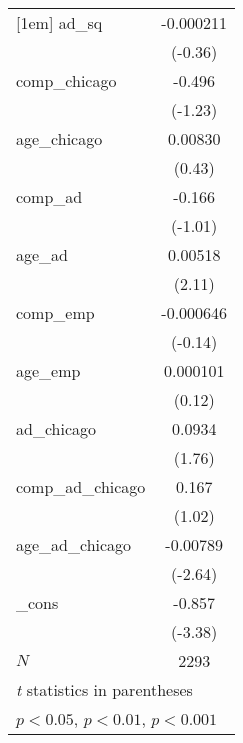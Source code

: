 {\begin{tabular}{l*{1}{c}}
[1em]
ad\_sq       &   -0.000211         \\
            &     (-0.36)         \\
[1em]
comp\_chicago&      -0.496         \\
            &     (-1.23)         \\
[1em]
age\_chicago &     0.00830         \\
            &      (0.43)         \\
[1em]
comp\_ad     &      -0.166         \\
            &     (-1.01)         \\
[1em]
age\_ad      &     0.00518\sym{*}  \\
            &      (2.11)         \\
[1em]
comp\_emp    &   -0.000646         \\
            &     (-0.14)         \\
[1em]
age\_emp     &    0.000101         \\
            &      (0.12)         \\
[1em]
ad\_chicago  &      0.0934         \\
            &      (1.76)         \\
[1em]
comp\_ad\_chicago&       0.167         \\
            &      (1.02)         \\
[1em]
age\_ad\_chicago&    -0.00789\sym{**} \\
            &     (-2.64)         \\
[1em]
\_cons      &      -0.857\sym{***}\\
            &     (-3.38)         \\
\hline
\(N\)       &        2293         \\
\hline\hline
\multicolumn{2}{l}{\footnotesize \textit{t} statistics in parentheses}\\
\multicolumn{2}{l}{\footnotesize \sym{*} \(p<0.05\), \sym{**} \(p<0.01\), \sym{***} \(p<0.001\)}\\
\end{tabular}
}

